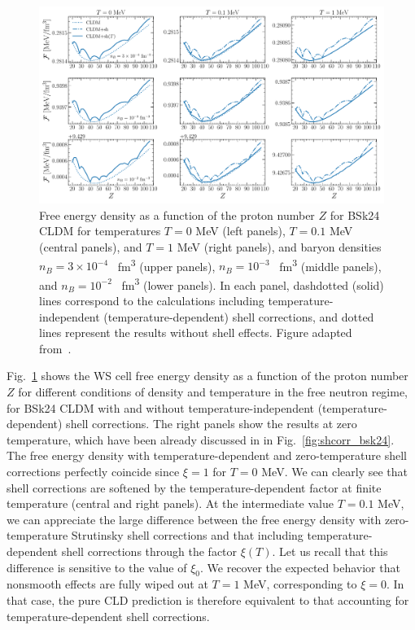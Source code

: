 \begin{figure}[!t]
  \begin{center}
    \includegraphics[width=1.0\linewidth]{figures/fdensws_vs_zz.pdf}
  \end{center}
  \caption[Free energy density versus proton number $Z$ for different
  thermodynamic conditions in the free neutron regime]{Free energy density as a 
    function of the proton number $Z$ for BSk24 CLDM for temperatures $T=0$ 
    \si{\MeV} (left panels), $T=0.1$ \si{\MeV} (central panels), and 
    $T=1$ \si{\MeV} (right panels), and baryon densities $n_B=3\times 10^{-4}$ 
    \si{\per \cubic\femto\meter} (upper panels), $n_B = 10^{-3}$ 
    \si{\per \cubic\femto\meter} (middle panels), and $n_B = 
    10^{-2}$ \si{\per \cubic\femto\meter} (lower panels). 
    In each panel, dashdotted (solid) lines correspond to the calculations
including temperature-independent (temperature-dependent) shell corrections,
and dotted lines represent the results without shell effects. Figure adapted
from~\cite{Carreau2019}.}\label{fig:fdensws_vs_zz}
\end{figure}
%
Fig.~\ref{fig:fdensws_vs_zz} shows the WS cell free energy density as a
function of the proton number $Z$ for different conditions of density
and temperature in the free neutron regime, for BSk24 CLDM with and without
temperature-independent (temperature-dependent) shell corrections.
%
The right panels show the results at zero temperature, 
which have been already discussed in in Fig.~\ref{fig:shcorr_bsk24}. The free
energy density with temperature-dependent and zero-temperature shell
corrections perfectly coincide since $\xi = 1$ for $T=0$ MeV.
%
We can clearly see that shell corrections are softened by the 
temperature-dependent factor at finite temperature (central and right panels). 
At the intermediate value $T=0.1$ MeV, we can appreciate the large 
difference between the free energy density with zero-temperature Strutinsky
shell corrections and that including temperature-dependent shell corrections
through the factor $\xi(T)$. Let us recall that this difference is sensitive to
the value of $\xi_0$.
%
We recover the expected behavior that nonsmooth effects are fully wiped out at 
$T=1$ MeV, corresponding to $\xi=0$. In that case, the pure CLD prediction is 
therefore equivalent to that accounting for temperature-dependent shell 
corrections.

